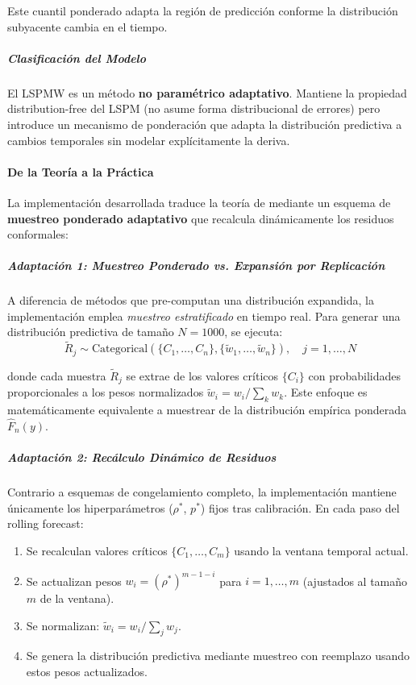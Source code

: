Este cuantil ponderado adapta la región de predicción conforme la distribución subyacente cambia en el tiempo.

\subparagraph{Clasificación del Modelo}
El LSPMW es un método \textbf{no paramétrico adaptativo}. Mantiene la propiedad distribution-free del LSPM (no asume forma distribucional de errores) pero introduce un mecanismo de ponderación que adapta la distribución predictiva a cambios temporales sin modelar explícitamente la deriva.

\paragraph{De la Teoría a la Práctica}

La implementación desarrollada traduce la teoría de \textcite{Barber2023} mediante un esquema de \textbf{muestreo ponderado adaptativo} que recalcula dinámicamente los residuos conformales:

\subparagraph{Adaptación 1: Muestreo Ponderado vs. Expansión por Replicación}
A diferencia de métodos que pre-computan una distribución expandida, la implementación emplea \textit{muestreo estratificado} en tiempo real. Para generar una distribución predictiva de tamaño $N = 1000$, se ejecuta:
\begin{equation}
\tilde{R}_j \sim \text{Categorical}(\{C_1, \dots, C_n\}, \{\tilde{w}_1, \dots, \tilde{w}_n\}), \quad j = 1, \dots, N
\end{equation}

donde cada muestra $\tilde{R}_j$ se extrae de los valores críticos $\{C_i\}$ con probabilidades proporcionales a los pesos normalizados $\tilde{w}_i = w_i / \sum_k w_k$. Este enfoque es matemáticamente equivalente a muestrear de la distribución empírica ponderada $\hat{F}_n(y)$.

\subparagraph{Adaptación 2: Recálculo Dinámico de Residuos}
Contrario a esquemas de congelamiento completo, la implementación mantiene únicamente los hiperparámetros ($\rho^*$, $p^*$) fijos tras calibración. En cada paso del rolling forecast:
\begin{enumerate}
    \item Se recalculan valores críticos $\{C_1, \dots, C_m\}$ usando la ventana temporal actual.
    \item Se actualizan pesos $w_i = (\rho^*)^{m-1-i}$ para $i = 1, \dots, m$ (ajustados al tamaño $m$ de la ventana).
    \item Se normalizan: $\tilde{w}_i = w_i / \sum_j w_j$.
    \item Se genera la distribución predictiva mediante muestreo con reemplazo usando estos pesos actualizados.
\end{enumerate}


